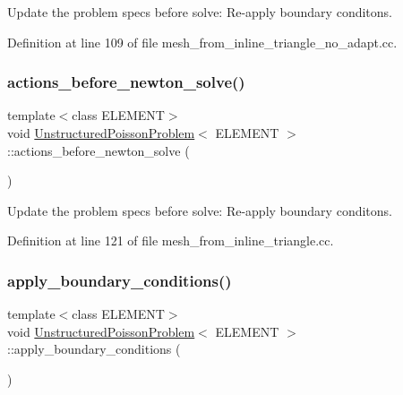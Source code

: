 Update the problem specs before solve\+: Re-\/apply boundary conditons. 



Definition at line 109 of file mesh\+\_\+from\+\_\+inline\+\_\+triangle\+\_\+no\+\_\+adapt.\+cc.

\mbox{\label{classUnstructuredPoissonProblem_a2ab9d23c0e6e6631ffe1a761f6bdf026}} 
\subsubsection{\texorpdfstring{actions\+\_\+before\+\_\+newton\+\_\+solve()}{actions\_before\_newton\_solve()}\hspace{0.1cm}{\footnotesize\ttfamily [2/2]}}
{\footnotesize\ttfamily template$<$class E\+L\+E\+M\+E\+NT$>$ \\
void \hyperlink{classUnstructuredPoissonProblem}{Unstructured\+Poisson\+Problem}$<$ E\+L\+E\+M\+E\+NT $>$\+::actions\+\_\+before\+\_\+newton\+\_\+solve (\begin{DoxyParamCaption}{ }\end{DoxyParamCaption})\hspace{0.3cm}{\ttfamily [inline]}}



Update the problem specs before solve\+: Re-\/apply boundary conditons. 



Definition at line 121 of file mesh\+\_\+from\+\_\+inline\+\_\+triangle.\+cc.

\mbox{\label{classUnstructuredPoissonProblem_ace8b8b3097ae2024a0589b2bf9b4ee7b}} 
\subsubsection{\texorpdfstring{apply\+\_\+boundary\+\_\+conditions()}{apply\_boundary\_conditions()}\hspace{0.1cm}{\footnotesize\ttfamily [1/2]}}
{\footnotesize\ttfamily template$<$class E\+L\+E\+M\+E\+NT$>$ \\
void \hyperlink{classUnstructuredPoissonProblem}{Unstructured\+Poisson\+Problem}$<$ E\+L\+E\+M\+E\+NT $>$\+::apply\+\_\+boundary\+\_\+conditions (\begin{DoxyParamCaption}{ }\end{DoxyParamCaption})\hspace{0.3cm}{\ttfamily [private]}}




